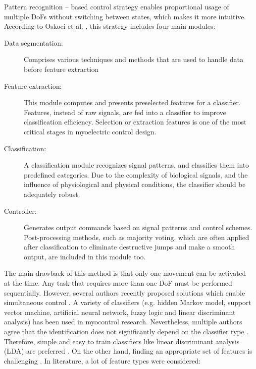 Pattern recognition – based control strategy enables proportional usage of multiple DoFs without switching between states, which makes it more intuitive. According to Oskoei et al. \citep{Oskoei2007}, this strategy includes four main modules:
\begin{description}
\item[Data segmentation:] Comprises various techniques and methods that are used to handle data before feature extraction
\item[Feature extraction:] This module computes and presents preselected features for a classifier. Features, instead of raw signals, are fed into a classifier to improve classification efficiency. Selection or extraction features is one of the most critical stages in myoelectric control design.
\item[Classification:] A classification module recognizes signal patterns, and classifies them into predefined categories. Due to the complexity of biological signals, and the influence of physiological and physical conditions, the classifier should be adequately robust.
\item[Controller:] Generates output commands based on signal patterns and control schemes. Post-processing methods, such as majority voting, which are often applied after classification to eliminate destructive jumps and make a smooth output, are included in this module too.
\end{description}

The main drawback of this method is that only one movement can be activated at the time. Any task that requires more than one DoF must be performed sequentially. However, several authors recently proposed solutions which enable simultaneous control \citep{Young2013, Kamavuako2013, Baker2010}. A variety of classifiers (e.g. hidden Markov model, support vector machine, artificial neural network, fuzzy logic and linear discriminant analysis) \citep{Oskoei2007} has been used in myocontrol research. Nevertheless, multiple authors agree that the identification does not significantly depend on the classifier type \citep{Hargrove2007, Zhang2012, Hakonen2015}. Therefore, simple and easy to train classifiers like linear discriminant analysis (LDA) are preferred \citep{Li2010, Englehart1999, Tkach2010, Li2014, Hakonen2015}. On the other hand, finding an appropriate set of features is challenging \citep{Englehart1999, Tkach2010, Liu2013}. In literature, a lot of feature types were considered: 

